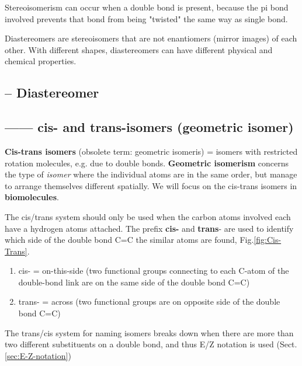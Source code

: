 Stereoisomerism can occur when a double bond is present, because the pi bond
involved prevents that bond from being "twisted" the same way as single bond.


Diastereomers are stereoisomers that are not enantiomers (mirror images) of each
other. With different shapes, diastereomers can have different physical and
chemical properties. 

\subsection{-- Diastereomer}
\label{sec:diastereomer}



\subsection{------ cis- and trans-isomers (geometric isomer)}
\label{sec:cis-}
\label{sec:trans-}


{\bf Cis-trans isomers } (obsolete term: geometric isomeris) = isomers with
restricted rotation molecules, e.g. due to double bonds. {\bf Geometric
isomerism} concerns the type of {\it isomer} where the individual atoms are in
the same order, but manage to arrange themselves different spatially.
We will focus on the cis-trans isomers in {\bf biomolecules}.

The cis/trans system should only be used when the carbon atoms involved each
have a hydrogen atoms attached. The prefix {\bf cis-} and {\bf trans}- are used
to identify which side of the double bond C=C the similar atoms are found,
Fig.\ref{fig:Cis-Trans}.
\begin{enumerate}
  \item cis- = on-this-side (two functional groups connecting to each C-atom  of
  the double-bond link are on the same side of the double bond C=C)
  
  \item trans- = across (two functional groups are on opposite side of the
  double bond C=C)
\end{enumerate}
The trans/cis system for naming isomers breaks down when there are more than two
different substituents on a double bond, and thus E/Z notation is used
(Sect.\ref{sec:E-Z-notation})

